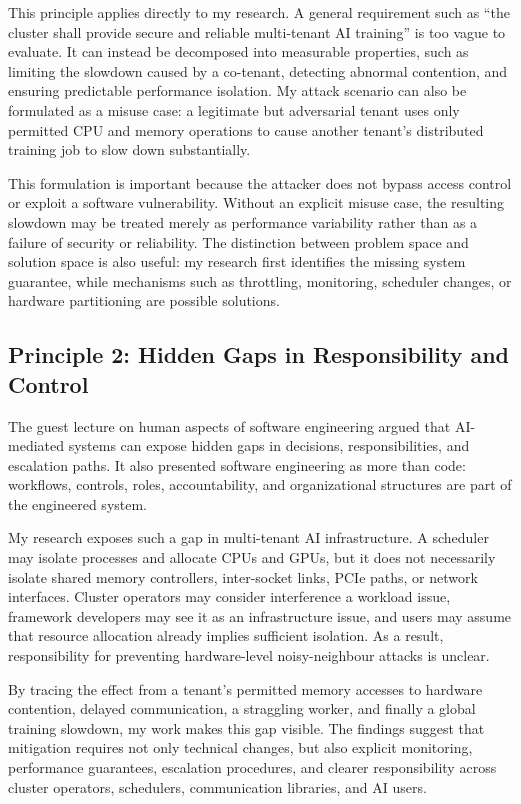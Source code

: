 \documentclass{article}
\begin{document}
This principle applies directly to my research. A general requirement such as
``the cluster shall provide secure and reliable multi-tenant AI training'' is
too vague to evaluate. It can instead be decomposed into measurable properties,
such as limiting the slowdown caused by a co-tenant, detecting abnormal
contention, and ensuring predictable performance isolation. My attack scenario
can also be formulated as a misuse case: a legitimate but adversarial tenant
uses only permitted CPU and memory operations to cause another tenant's
distributed training job to slow down substantially.

This formulation is important because the attacker does not bypass access
control or exploit a software vulnerability. Without an explicit misuse case,
the resulting slowdown may be treated merely as performance variability rather
than as a failure of security or reliability. The distinction between problem
space and solution space is also useful: my research first identifies the
missing system guarantee, while mechanisms such as throttling, monitoring,
scheduler changes, or hardware partitioning are possible solutions.

\subsection{Principle 2: Hidden Gaps in Responsibility and Control}
The guest lecture on human aspects of software engineering argued that
AI-mediated systems can expose hidden gaps in decisions, responsibilities, and
escalation paths. It also presented software engineering as more than code:
workflows, controls, roles, accountability, and organizational structures are
part of the engineered system.

My research exposes such a gap in multi-tenant AI infrastructure. A scheduler
may isolate processes and allocate CPUs and GPUs, but it does not necessarily
isolate shared memory controllers, inter-socket links, PCIe paths, or network
interfaces. Cluster operators may consider interference a workload issue,
framework developers may see it as an infrastructure issue, and users may
assume that resource allocation already implies sufficient isolation. As a
result, responsibility for preventing hardware-level noisy-neighbour attacks
is unclear.

By tracing the effect from a tenant's permitted memory accesses to hardware
contention, delayed communication, a straggling worker, and finally a global
training slowdown, my work makes this gap visible. The findings suggest that
mitigation requires not only technical changes, but also explicit monitoring,
performance guarantees, escalation procedures, and clearer responsibility
across cluster operators, schedulers, communication libraries, and AI users.
\end{document}
